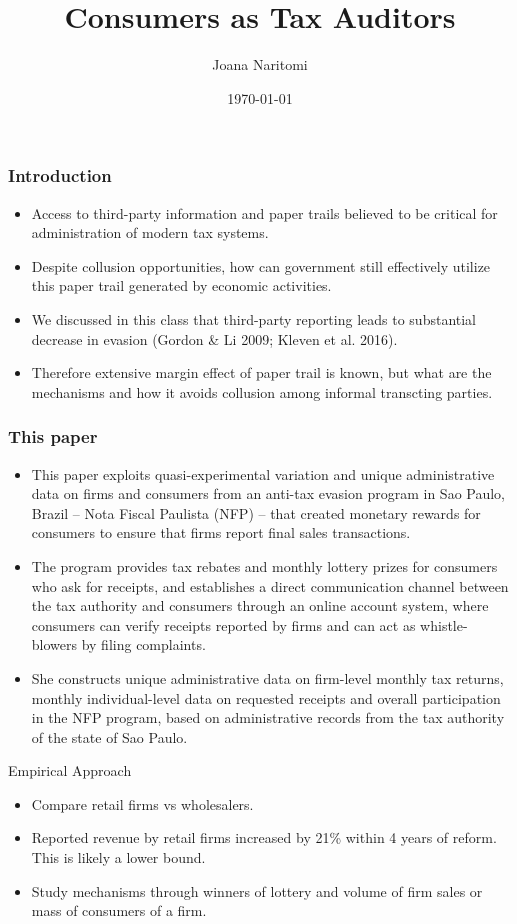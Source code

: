 \documentclass{beamer}
\title{Consumers as Tax Auditors}
\author{Joana Naritomi}
\date{\today}
\begin{document}
\frame{\titlepage}

\begin{frame}
\frametitle{Introduction}
\begin{itemize}
\item Access to third-party information and paper trails believed to be critical for administration of modern tax systems.
\item Despite collusion opportunities, how can government still effectively utilize this paper trail generated by economic activities. 
\item We discussed in this class that third-party reporting leads to substantial decrease in evasion  (Gordon \& Li 2009;
Kleven et al. 2016).
\item Therefore extensive margin effect of paper trail is known, but what are the mechanisms and how it avoids collusion among informal transcting parties.  

\end{itemize}
\end{frame}

\begin{frame}
\frametitle{This paper}
\begin{itemize}
    \item This paper exploits quasi-experimental variation and unique administrative data on firms and consumers from an anti-tax evasion program in Sao Paulo, Brazil – Nota Fiscal Paulista (NFP) – that created monetary rewards for consumers to ensure that firms report final sales transactions. 
    \item The program provides tax rebates and
monthly lottery prizes for consumers who ask for receipts, and establishes a direct communication
channel between the tax authority and consumers through an online account system, where consumers can verify receipts reported by firms and can act as whistle-blowers by filing complaints.
\item She constructs unique administrative data on firm-level monthly tax returns, monthly
individual-level data on requested receipts and overall participation in the NFP program, based
on administrative records from the tax authority of the state of Sao Paulo.
\end{itemize}
\end{frame}

\begin{frame}{Empirical Approach}
\begin{itemize}
    \item Compare retail firms vs wholesalers. 
    \item Reported revenue by retail firms increased by 21\% within 4 years of reform. This is likely a lower bound.
    \item Study mechanisms through winners of lottery and volume of firm sales or mass of consumers of a firm. 
\end{itemize}
\end{frame}
\end{document}
